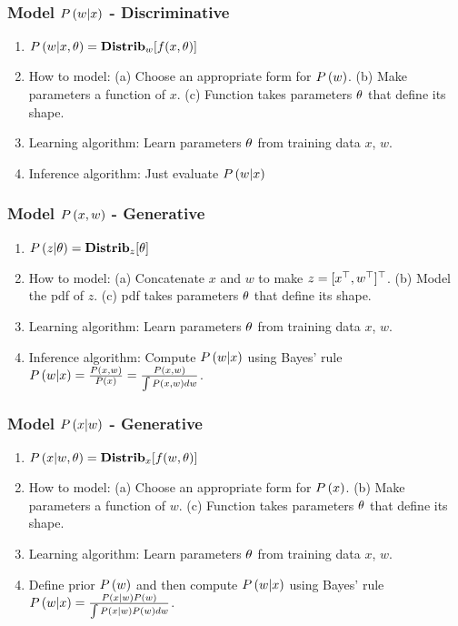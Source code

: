 \subsubsection*{Model $\P{w|x}$ - Discriminative}
	\begin{enumerate}
		\item $\P{w|x,\th}=\Dis_w[f(x,\th)]$
		\item How to model: (a) Choose an appropriate form for $\P{w}$. (b) Make parameters a function of $x$. (c) Function takes parameters $\th$ that define its shape.
		\item Learning algorithm: Learn parameters $\th$ from training data $x$, $w$.
		\item Inference algorithm: Just evaluate $\P{w|x}$
	\end{enumerate}

\subsubsection*{Model $\P{x,w}$ - Generative}
	\begin{enumerate}
		\item $\P{z|\th}=\Dis_z[\th]$
		\item How to model: (a) Concatenate $x$ and $w$ to make $z=[x\T,w\T]\T$. (b) Model the pdf of $z$. (c) pdf takes parameters $\th$ that define its shape.
		\item Learning algorithm: Learn parameters $\th$ from training data $x$, $w$.
		\item Inference algorithm: Compute $\P{w|x}$ using Bayes' rule $\P{w|x}=\frac{\P{x,w}}{\P{x}}=\frac{\P{x,w}}{\int\P{x,w}dw}$.
	\end{enumerate}

\subsubsection*{Model $\P{x|w}$ - Generative}
	\begin{enumerate}
		\item $\P{x|w,\th}=\Dis_x[f(w,\th)]$
		\item How to model: (a) Choose an appropriate form for $\P{x}$. (b) Make parameters a function of $w$. (c) Function takes parameters $\th$ that define its shape.
		\item Learning algorithm: Learn parameters $\th$ from training data $x$, $w$.
		\item Define prior $\P{w}$ and then compute $\P{w|x}$ using Bayes' rule $\P{w|x}=\frac{\P{x|w}\P{w}}{\int\P{x|w}\P{w}dw}$.
	\end{enumerate}

